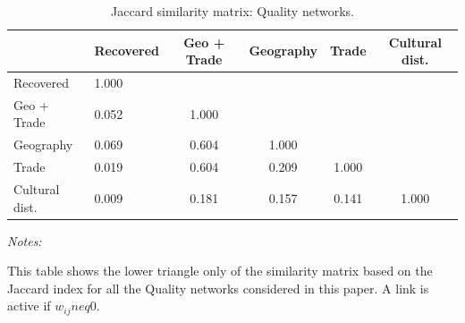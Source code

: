 \begin{table}[!h]
\centering
\caption{\label{tab:jaccard_similarity_quality}Jaccard similarity matrix: Quality networks.}
\centering
\fontsize{9}{11}\selectfont
\begin{threeparttable}
\begin{tabular}[t]{llcccc}
\toprule
  & Recovered & Geo + Trade & Geography & Trade & Cultural dist.\\
\midrule
Recovered & 1.000 &  &  &  & \\
Geo + Trade & 0.052 & 1.000 &  &  & \\
Geography & 0.069 & 0.604 & 1.000 &  & \\
Trade & 0.019 & 0.604 & 0.209 & 1.000 & \\
Cultural dist. & 0.009 & 0.181 & 0.157 & 0.141 & 1.000\\
\bottomrule
\end{tabular}
\begin{tablenotes}[para]
\item \textit{Notes:} 
\item This table shows the lower triangle only of the similarity matrix based on the Jaccard index for all the Quality networks considered in this paper. A link is active if $w_{ij} neq 0$.
\end{tablenotes}
\end{threeparttable}
\end{table}

